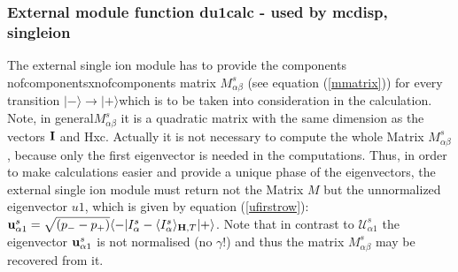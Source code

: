 \subsubsection{External module function {\prg du1calc} - used by {\prg mcdisp},{\prg %
singleion}}

The external single ion module has to provide the components nofcomponentsxnofcomponents
matrix $M^s_{\alpha\beta}$ (see equation (\ref{mmatrix})) for every transition
$|-\rangle \rightarrow |+\rangle$which is to be taken into consideration 
in the calculation. Note, in general$M^s_{\alpha\beta}$ it is a quadratic matrix with the same
dimension as the vectors $\mathbf I$ and Hxc. 
Actually it is not necessary to compute the whole  Matrix $M^s_{\alpha\beta}$, because
only the first eigenvector is needed in the computations.
Thus, in order to make calculations easier and provide a unique phase of the eigenvectors, the 
external single ion module must return not the Matrix $M$ but the unnormalized
eigenvector $u1$, which is given by equation (\ref{ufirstrow}):
 ${\mathbf u^s_{\alpha1}}=\sqrt{(p_--p_+)}\langle -|I^s_{\alpha}-\langle I^s_{\alpha}\rangle_{\mathbf H,T}|+\rangle$. 
Note that in contrast to ${\mathcal U^s_{\alpha1}}$ the eigenvector
${\mathbf u^s_{\alpha1}}$ is not normalised (no $\gamma$!)
and thus the matrix  $M^s_{\alpha\beta}$ may be recovered from it.

